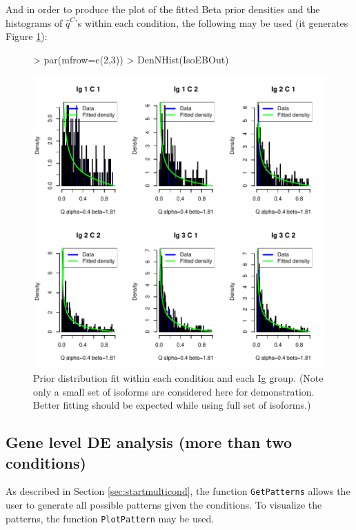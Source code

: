 \documentclass{article}
\begin{document}
\newpage
\noindent And in order to produce the plot of the fitted Beta prior densities
and the histograms of $\hat{q}^C$'s within each condition, 
the following may be used (it generates Figure \ref{fig:IsoDenNHist}):
\begin{figure}[h]
\centering
\begin{Schunk}
\begin{Sinput}
> par(mfrow=c(2,3))
> DenNHist(IsoEBOut)
\end{Sinput}
\end{Schunk}
\includegraphics{EBSeq_Vignette-035}
\caption{ Prior distribution fit within each condition and each Ig group.
(Note only a small set of isoforms are considered here for demonstration.
Better fitting should be expected while using full set of isoforms.)}
\label{fig:IsoDenNHist}
\end{figure}

\clearpage
\subsection{Gene level DE analysis (more than two conditions)}
\label{sec:detailedmulticond}
As described in Section \ref{sec:startmulticond}, 
the function \verb+GetPatterns+ allows the user to generate all possible patterns given the conditions.
To visualize the patterns, the function \verb+PlotPattern+ may be used.
\end{document}
